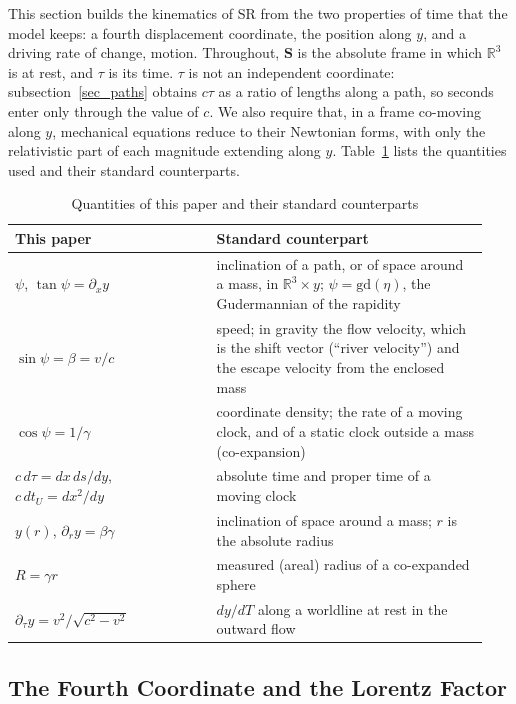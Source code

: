 \documentclass{iopjournal}
\begin{document}
This section builds the kinematics of SR from the two properties of time that the model keeps: a fourth displacement coordinate, the position along $y$, and a driving rate of change, motion. Throughout, $\mathbf{S}$ is the absolute frame in which $\mathbb{R}^3$ is at rest, and $\tau$ is its time. $\tau$ is not an independent coordinate: subsection~\ref{sec_paths} obtains $c\tau$ as a ratio of lengths along a path, so seconds enter only through the value of $c$. We also require that, in a frame co-moving along $y$, mechanical equations reduce to their Newtonian forms, with only the relativistic part of each magnitude extending along $y$. Table~\ref{table_dictionary} lists the quantities used and their standard counterparts.

\begin{table}[h]
\caption{Quantities of this paper and their standard counterparts}%
\label{table_dictionary}
\begin{tabular}{@{}p{0.40\linewidth}p{0.54\linewidth}@{}}
\toprule
This paper & Standard counterpart\\
\midrule
$\psi$, $\tan\psi=\partial_x y$ & inclination of a path, or of space around a mass, in $\mathbb{R}^3\times y$; $\psi=\mathrm{gd}(\eta)$, the Gudermannian of the rapidity\\
$\sin\psi=\beta=v/c$ & speed; in gravity the flow velocity, which is the shift vector (``river velocity'') and the escape velocity from the enclosed mass\\
$\cos\psi=1/\gamma$ & coordinate density; the rate of a moving clock, and of a static clock outside a mass (co-expansion)\\
$c\,d\tau=dx\,ds/dy$, $c\,dt_U=dx^2/dy$ & absolute time and proper time of a moving clock\\
$y(r)$, $\partial_r y=\beta\gamma$ & inclination of space around a mass; $r$ is the absolute radius\\
$R=\gamma r$ & measured (areal) radius of a co-expanded sphere\\
$\partial_\tau y=v^2/\sqrt{c^2-v^2}$ & $dy/dT$ along a worldline at rest in the outward flow\\
\bottomrule
\end{tabular}
\end{table}

\subsection{The Fourth Coordinate and the Lorentz Factor}\label{sec_fourth_coordinate}
\end{document}
